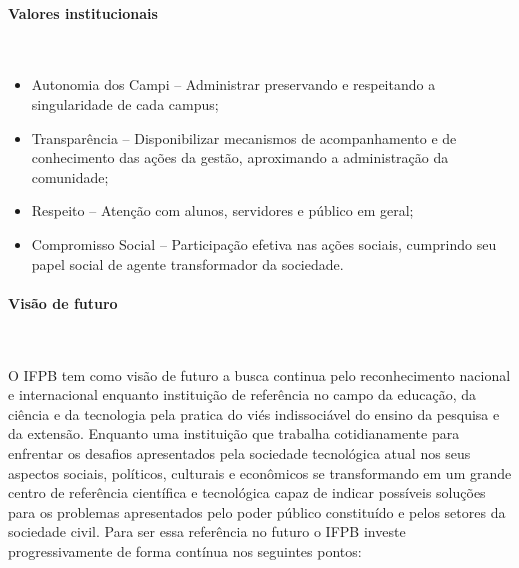 \paragraph{Valores institucionais}\

\begin{itemize}
	\item Autonomia dos Campi – Administrar preservando e respeitando a singularidade de cada campus;
	\item Transparência – Disponibilizar mecanismos de acompanhamento e de conhecimento das ações da gestão, aproximando a administração da comunidade;
	\item Respeito – Atenção com alunos, servidores e público em geral;
	\item Compromisso Social – Participação efetiva nas ações sociais, cumprindo seu papel social de agente transformador da sociedade.
\end{itemize}

\paragraph{Visão de futuro}\

 O IFPB tem como visão de futuro a busca continua pelo reconhecimento nacional e internacional enquanto instituição de referência no campo da educação, da ciência e da tecnologia pela pratica do viés indissociável do ensino da pesquisa e da extensão. Enquanto uma instituição que trabalha cotidianamente para enfrentar os desafios apresentados pela sociedade tecnológica atual nos seus aspectos sociais, políticos, culturais e econômicos se transformando em um grande centro de referência científica e tecnológica capaz de indicar possíveis soluções para os problemas apresentados pelo poder público constituído e pelos setores da sociedade civil. Para ser essa referência no futuro o IFPB investe progressivamente de forma cont\'inua nos seguintes pontos:

